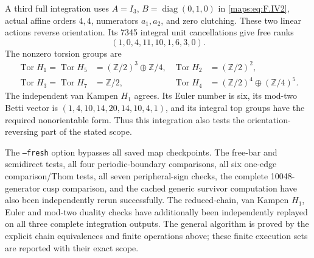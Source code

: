 \documentclass[11pt,a4paper]{article}
\theoremstyle{definition}
\begin{document}
A third full integration uses
$A=I_3$, $B=\operatorname{diag}(0,1,0)$ in \eqref{maps:eq:F.IV2},
actual affine orders $4,4$, numerators $a_1,a_2$, and zero
clutching.  These two linear actions reverse orientation.
Its 7345 integral unit cancellations give free ranks
\[
                  (1,0,4,11,10,1,6,3,0).
\]
The nonzero torsion groups are
\[
\begin{aligned}
 \operatorname{Tor}H_1=\operatorname{Tor}H_5
       &=(\mathbb Z/2)^3\oplus\mathbb Z/4,&
 \operatorname{Tor}H_2&=(\mathbb Z/2)^2,\\
 \operatorname{Tor}H_3=\operatorname{Tor}H_7
       &=\mathbb Z/2,&
 \operatorname{Tor}H_4&=(\mathbb Z/2)^4\oplus(\mathbb Z/4)^5.
\end{aligned}
\]
The independent van Kampen $H_1$ agrees.  Its Euler number
is six, its mod-two Betti vector is
$(1,4,10,14,20,14,10,4,1)$, and its integral top groups
have the required nonorientable form.  Thus this integration
also tests the orientation-reversing part of the stated scope.

The \texttt{--fresh} option bypasses all saved map checkpoints.
The free-bar and semidirect tests, all four periodic-boundary
comparisons, all six one-edge comparison/Thom tests, all seven
peripheral-sign checks, the complete 10048-generator cusp
comparison, and the cached generic survivor computation have
also been independently rerun successfully.  The
reduced-chain, van Kampen $H_1$, Euler and mod-two duality
checks have additionally been independently replayed on
all three complete integration outputs.  The general
algorithm is proved by the explicit chain equivalences and
finite operations above; these finite execution sets are
reported with their exact scope.
\end{document}
